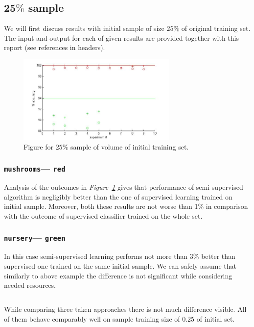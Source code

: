\documentclass[12pt, a4paper, pdflatex]{report}
\begin{document}
\subsection{$\mathbf{25\%}$ sample~\cite{results25} \label{sec:results25}}
We will first discuss results with initial sample of size $25\%$ of original training set. The input and output for each of given results are provided together with this report (see references in headers).
\begin{figure}[htbp]
\centering
  \includegraphics[width=0.7\textwidth]{graphics/figures/Pfig1.jpg}
\begin{tiny}
\caption{\small Figure for $25\%$ sample of volume of initial training set.\label{img:25pc}}
\end{tiny}
\end{figure}

\subsubsection{\texttt{mushrooms}--- \texttt{red}}
Analysis of the outcomes in \emph{Figure~\ref{img:25pc}} gives that performance of semi-supervised algorithm is negligibly better than the one of supervised learning trained on initial sample. Moreover, both these results are not worse than 1\% in comparison with the outcome of supervised classifier trained on the whole set.

\subsubsection{\texttt{nursery}--- \texttt{green}}
In this case semi-supervised learning performs not more than 3\% better than supervised one trained on the same initial sample. We can safely assume that similarly to above example the difference is not significant while considering needed resources.

\subsection*{}
While comparing three taken approaches there is not much difference visible. All of them behave comparably well on sample training size of 0.25 of initial set.\\
\end{document}
